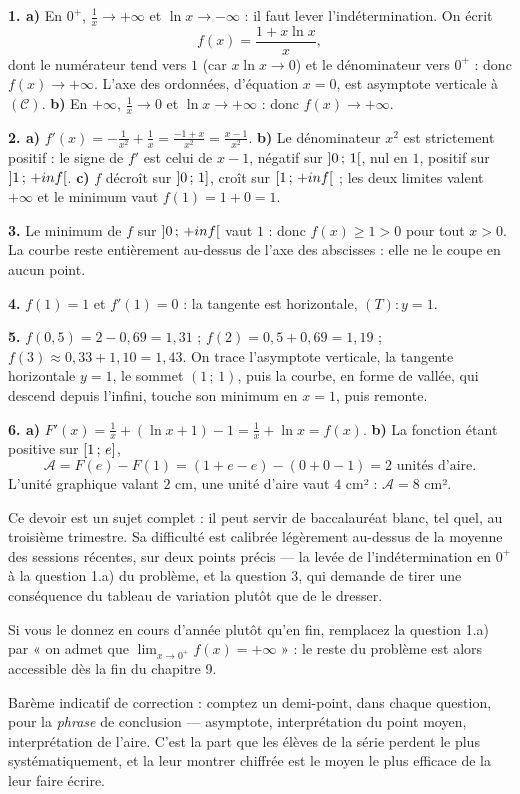 \begin{corrige}
\textbf{1. a)} En $0^{+}$, $\frac1x \to +\infty$ et $\ln x \to -\infty$ :
il faut lever l'indétermination. On écrit
\[
  f(x) = \frac{1+x\ln x}{x},
\]
dont le numérateur tend vers $1$ (car $x\ln x \to 0$) et le dénominateur
vers $0^{+}$ : donc $f(x) \to +\infty$. L'axe des ordonnées, d'équation
$x = 0$, est asymptote verticale à $(\mathcal C)$.
\textbf{b)} En $+\infty$, $\frac1x \to 0$ et $\ln x \to +\infty$ : donc
$f(x) \to +\infty$.

\textbf{2. a)} $f'(x) = -\frac{1}{x^{2}}+\frac1x
= \frac{-1+x}{x^{2}} = \frac{x-1}{x^{2}}$.
\textbf{b)} Le dénominateur $x^{2}$ est strictement positif : le signe de
$f'$ est celui de $x-1$, négatif sur $\left]0\,;\,1\right[$, nul en $1$,
positif sur $\left]1\,;\,+inf\right[$.
\textbf{c)} $f$ décroît sur $\left]0\,;\,1\right]$, croît sur
$\left[1\,;\,+inf\right[$ ; les deux limites valent $+\infty$ et le
minimum vaut $f(1) = 1+0 = 1$.

\textbf{3.} Le minimum de $f$ sur $\left]0\,;\,+inf\right[$ vaut $1$ :
donc $f(x) \geq 1 > 0$ pour tout $x>0$. La courbe reste entièrement
au-dessus de l'axe des abscisses : elle ne le coupe en aucun point.

\textbf{4.} $f(1) = 1$ et $f'(1) = 0$ : la tangente est horizontale,
$(T) : y = 1$.

\textbf{5.} $f(0{,}5) = 2-0{,}69 = 1{,}31$ ;
$f(2) = 0{,}5+0{,}69 = 1{,}19$ ; $f(3) \approx 0{,}33+1{,}10 = 1{,}43$. On
trace l'asymptote verticale, la tangente horizontale $y = 1$, le sommet
$(1\,;\,1)$, puis la courbe, en forme de vallée, qui descend depuis
l'infini, touche son minimum en $x = 1$, puis remonte.

\textbf{6. a)} $F'(x) = \frac1x+\left(\ln x+1\right)-1 = \frac1x+\ln x
= f(x)$. \checkmark
\textbf{b)} La fonction étant positive sur $\left[1\,;\,e\right]$,
\[
  \mathcal A = F(e)-F(1) = \left(1+e-e\right)-\left(0+0-1\right) = 2
  \text{ unités d'aire}.
\]
L'unité graphique valant $2$ cm, une unité d'aire vaut $4$ cm² :
$\mathcal A = 8$ cm².
\end{corrige}

\begin{notepourlaclasse}
Ce devoir est un sujet complet : il peut servir de baccalauréat blanc, tel
quel, au troisième trimestre. Sa difficulté est calibrée légèrement
au-dessus de la moyenne des sessions récentes, sur deux points précis — la
levée de l'indétermination en $0^{+}$ à la question 1.a) du problème, et la
question 3, qui demande de tirer une conséquence du tableau de variation
plutôt que de le dresser.

Si vous le donnez en cours d'année plutôt qu'en fin, remplacez la question
1.a) par « on admet que $\displaystyle\lim_{x \to 0^{+}} f(x) = +\infty$ » :
le reste du problème est alors accessible dès la fin du chapitre 9.

Barème indicatif de correction : comptez un demi-point, dans chaque
question, pour la \emph{phrase} de conclusion — asymptote, interprétation du
point moyen, interprétation de l'aire. C'est la part que les élèves de la
série perdent le plus systématiquement, et la leur montrer chiffrée est le
moyen le plus efficace de la leur faire écrire.
\end{notepourlaclasse}
